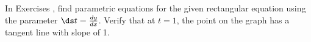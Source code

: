 {\noindent In Exercises}
{, find parametric equations for the given rectangular equation using the parameter $\ds t=\frac{dy}{dx}$. Verify that at $t=1$, the point on the graph has a tangent line with slope of 1.
}
